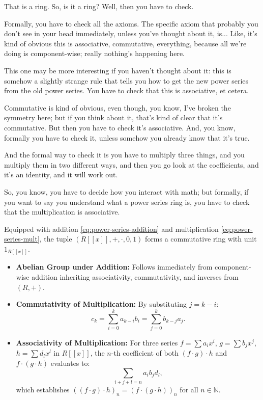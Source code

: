 \begin{speech}[00:30:25 - 00:31:28]
That is a ring. So, is it a ring? Well, then you have to check.

Formally, you have to check all the axioms. The specific axiom that probably you don't see in your head immediately, unless you've thought about it, is... Like, it's kind of obvious this is associative, commutative, everything, because all we're doing is component-wise; really nothing's happening here.

This one may be more interesting if you haven't thought about it: this is somehow a slightly strange rule that tells you how to get the new power series from the old power series. You have to check that this is associative, et cetera.

Commutative is kind of obvious, even though, you know, I've broken the symmetry here; but if you think about it, that's kind of clear that it's commutative. But then you have to check it's associative. And, you know, formally you have to check it, unless somehow you already know that it's true.

And the formal way to check it is you have to multiply three things, and you multiply them in two different ways, and then you go look at the coefficients, and it's an identity, and it will work out.

So, you know, you have to decide how you interact with math; but formally, if you want to say you understand what a power series ring is, you have to check that the multiplication is associative.
\end{speech}

\begin{content}
Equipped with addition \eqref{eq:power-series-addition} and multiplication \eqref{eq:power-series-mult}, the tuple $(R[[x]], +, \cdot, 0, 1)$ forms a commutative ring with unit $1_{R[[x]]}$.

\begin{steps}
\begin{itemize}
    \item \textbf{Abelian Group under Addition:} Follows immediately from component-wise addition inheriting associativity, commutativity, and inverses from $(R, +)$.
    \item \textbf{Commutativity of Multiplication:} By substituting $j = k - i$:
    \[
    c_k = \sum_{i=0}^k a_{k-i} b_i = \sum_{j=0}^k b_{k-j} a_j.
    \]
    \item \textbf{Associativity of Multiplication:} For three series $f = \sum a_i x^i$, $g = \sum b_j x^j$, $h = \sum d_l x^l$ in $R[[x]]$, the $n$-th coefficient of both $(f \cdot g) \cdot h$ and $f \cdot (g \cdot h)$ evaluates to:
    \[
    \sum_{i+j+l=n} a_i b_j d_l,
    \]
    which establishes $((f \cdot g) \cdot h)_n = (f \cdot (g \cdot h))_n$ for all $n \in \mathbb{N}$.
\end{itemize}
\end{steps}
\end{content}

